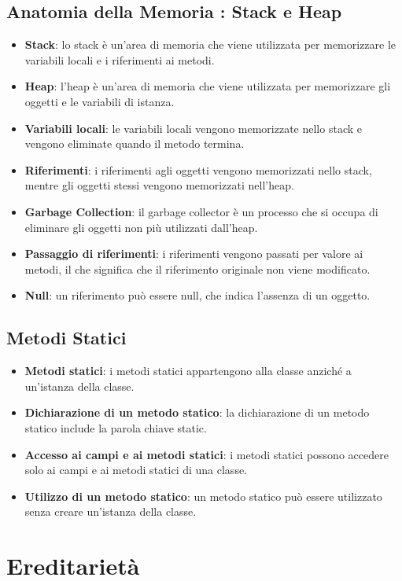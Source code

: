\documentclass[11pt]{article}
\begin{document}
\subsection{Anatomia della Memoria : Stack e Heap}
\begin{itemize}
    \item \textbf{Stack}: lo stack è un'area di memoria che viene utilizzata per memorizzare le variabili locali e i riferimenti ai metodi.
    \item \textbf{Heap}: l'heap è un'area di memoria che viene utilizzata per memorizzare gli oggetti e le variabili di istanza.
    \item \textbf{Variabili locali}: le variabili locali vengono memorizzate nello stack e vengono eliminate quando il metodo termina.
    \item \textbf{Riferimenti}: i riferimenti agli oggetti vengono memorizzati nello stack, mentre gli oggetti stessi vengono memorizzati nell'heap.
    \item \textbf{Garbage Collection}: il garbage collector è un processo che si occupa di eliminare gli oggetti non più utilizzati dall'heap.
    \item \textbf{Passaggio di riferimenti}: i riferimenti vengono passati per valore ai metodi, il che significa che il riferimento originale non viene modificato.
    \item \textbf{Null}: un riferimento può essere null, che indica l'assenza di un oggetto.
\end{itemize}
\subsection{Metodi Statici}
\begin{itemize}
    \item \textbf{Metodi statici}: i metodi statici appartengono alla classe anziché a un'istanza della classe.
    \item \textbf{Dichiarazione di un metodo statico}: la dichiarazione di un metodo statico include la parola chiave static.
    \item \textbf{Accesso ai campi e ai metodi statici}: i metodi statici possono accedere solo ai campi e ai metodi statici di una classe.
    \item \textbf{Utilizzo di un metodo statico}: un metodo statico può essere utilizzato senza creare un'istanza della classe.
\end{itemize}

\section{Ereditarietà}
\end{document}
